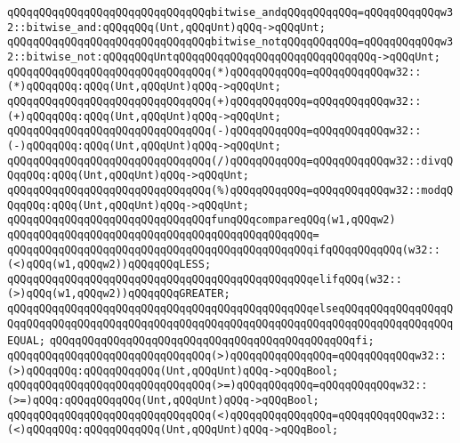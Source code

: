 \verb|qQQqqQQqqQQqqQQqqQQqqQQqqQQqqQQqbitwise_andqQQqqQQqqQQq=qQQqqQQqqQQqw32::bitwise_and:qQQqqQQq(Unt,qQQqUnt)qQQq->qQQqUnt;|\newline
\verb|qQQqqQQqqQQqqQQqqQQqqQQqqQQqqQQqbitwise_notqQQqqQQqqQQq=qQQqqQQqqQQqw32::bitwise_not:qQQqqQQqUntqQQqqQQqqQQqqQQqqQQqqQQqqQQqqQQq->qQQqUnt;|\newline
\newline
\verb|qQQqqQQqqQQqqQQqqQQqqQQqqQQqqQQq(*)qQQqqQQqqQQq=qQQqqQQqqQQqw32::(*)qQQqqQQq:qQQq(Unt,qQQqUnt)qQQq->qQQqUnt;|\newline
\verb|qQQqqQQqqQQqqQQqqQQqqQQqqQQqqQQq(+)qQQqqQQqqQQq=qQQqqQQqqQQqw32::(+)qQQqqQQq:qQQq(Unt,qQQqUnt)qQQq->qQQqUnt;|\newline
\verb|qQQqqQQqqQQqqQQqqQQqqQQqqQQqqQQq(-)qQQqqQQqqQQq=qQQqqQQqqQQqw32::(-)qQQqqQQq:qQQq(Unt,qQQqUnt)qQQq->qQQqUnt;|\newline
\verb|qQQqqQQqqQQqqQQqqQQqqQQqqQQqqQQq(/)qQQqqQQqqQQq=qQQqqQQqqQQqw32::divqQQqqQQq:qQQq(Unt,qQQqUnt)qQQq->qQQqUnt;|\newline
\verb|qQQqqQQqqQQqqQQqqQQqqQQqqQQqqQQq(%)qQQqqQQqqQQq=qQQqqQQqqQQqw32::modqQQqqQQq:qQQq(Unt,qQQqUnt)qQQq->qQQqUnt;|\newline
\newline
\verb|qQQqqQQqqQQqqQQqqQQqqQQqqQQqqQQqfunqQQqcompareqQQq(w1,qQQqw2)|\newline
\verb|qQQqqQQqqQQqqQQqqQQqqQQqqQQqqQQqqQQqqQQqqQQqqQQq=|\newline
\verb|qQQqqQQqqQQqqQQqqQQqqQQqqQQqqQQqqQQqqQQqqQQqqQQqifqQQqqQQqqQQq(w32::(<)qQQq(w1,qQQqw2))qQQqqQQqLESS;|\newline
\verb|qQQqqQQqqQQqqQQqqQQqqQQqqQQqqQQqqQQqqQQqqQQqqQQqelifqQQq(w32::(>)qQQq(w1,qQQqw2))qQQqqQQqGREATER;|\newline
\verb|qQQqqQQqqQQqqQQqqQQqqQQqqQQqqQQqqQQqqQQqqQQqqQQqelseqQQqqQQqqQQqqQQqqQQqqQQqqQQqqQQqqQQqqQQqqQQqqQQqqQQqqQQqqQQqqQQqqQQqqQQqqQQqqQQqqQQqqQQqEQUAL;|\newline
\verb|qQQqqQQqqQQqqQQqqQQqqQQqqQQqqQQqqQQqqQQqqQQqqQQqfi;|\newline
\newline
\verb|qQQqqQQqqQQqqQQqqQQqqQQqqQQqqQQq(>)qQQqqQQqqQQqqQQq=qQQqqQQqqQQqw32::(>)qQQqqQQq:qQQqqQQqqQQq(Unt,qQQqUnt)qQQq->qQQqBool;|\newline
\verb|qQQqqQQqqQQqqQQqqQQqqQQqqQQqqQQq(>=)qQQqqQQqqQQq=qQQqqQQqqQQqw32::(>=)qQQq:qQQqqQQqqQQq(Unt,qQQqUnt)qQQq->qQQqBool;|\newline
\verb|qQQqqQQqqQQqqQQqqQQqqQQqqQQqqQQq(<)qQQqqQQqqQQqqQQq=qQQqqQQqqQQqw32::(<)qQQqqQQq:qQQqqQQqqQQq(Unt,qQQqUnt)qQQq->qQQqBool;|\newline
